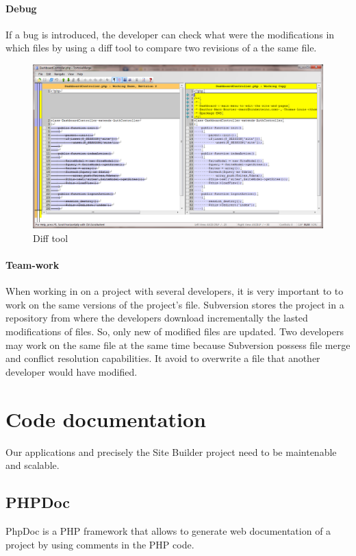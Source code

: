 \paragraph*{Debug}
If a bug is introduced, the developer can check what were the modifications in which files by using a diff tool to compare two revisions of a the same file.

\begin{figure}[!ht]
\centering
\includegraphics[width=.85\textwidth]{img/diff.png}
\caption{Diff tool}
\label{figure:diff}
\end{figure}

\paragraph*{Team-work}
When working in on a project with several developers, it is very important to to work on the same versions of the project's file. Subversion stores the project in a repository from where the developers download incrementally the lasted modifications of files. So, only new of modified files are updated. Two developers may work on the same file at the same time because Subversion possess file merge and conflict resolution capabilities. It avoid to overwrite a file that another developer would have modified.

\section{Code documentation}
Our applications and precisely the Site Builder project need to be maintenable and scalable. 
\subsection{PHPDoc}
PhpDoc is a PHP framework that allows to generate web documentation of a project by using comments in the PHP code.

